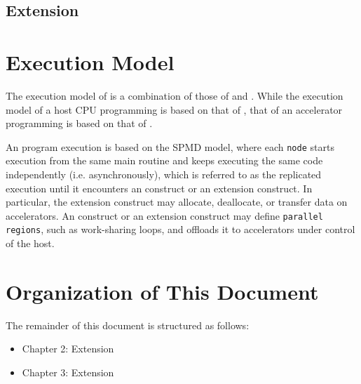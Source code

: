 \subsection{{\OACC} Extension}

\section{Execution Model}
The execution model of {\XACC} is a combination of those of {\XMP} and {\OACC}.
While the execution model of a host CPU programming is based on that of {\XMP},
that of an accelerator programming is based on that of {\OACC}.

An {\XACC} program execution is based on the SPMD model, 
where each {\tt node} starts execution from the same main routine and keeps executing the same code independently (i.e. asynchronously), 
which is referred to as the replicated execution
until it encounters an {\XMP} construct or an {\XMP} extension construct.
In particular,
the {\XMP} extension construct may allocate, deallocate, or transfer data on accelerators.
An {\OACC} construct or an {\OACC} extension construct may define {\tt parallel regions}, such as work-sharing loops, 
and offloads it to accelerators under control of the host.

\section{Organization of This Document}
The remainder of this document is structured as follows:

\begin{itemize}
 \item Chapter 2: {\XMP} Extension
 \item Chapter 3: {\OACC} Extension
\end{itemize}
